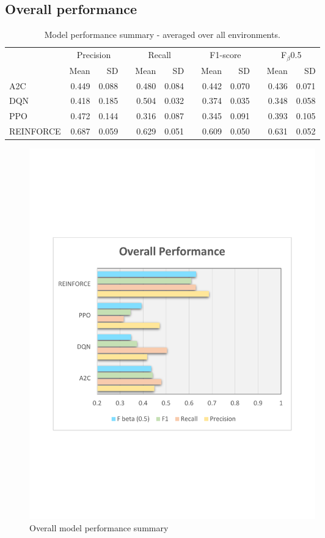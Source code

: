 \documentclass[a4paper, 12pt]{article}
\newcommand{\rowspace}[1]{\renewcommand{\arraystretch}{#1}}
\begin{document}
\subsection{Overall performance}
\begin{table}[h]\centering
	\sffamily
	\rowspace{1.3}
	\begin{tabular}{@{}l rr c rr c rr c rr@{}}
		\arrayrulecolor{black!40}\toprule
		& \multicolumn{2}{c}{Precision} & \phantom{i} & \multicolumn{2}{c}{Recall} & \phantom{i} & \multicolumn{2}{c}{F1-score} & \phantom{i} & \multicolumn{2}{c}{F$_\beta$0.5} \\
		\cmidrule{2-3} \cmidrule{5-6} \cmidrule{8-9} \cmidrule{11-12} 
		
		&Mean &SD & &Mean &SD & &Mean &SD& &Mean & SD\\ \midrule
		
		A2C & 0.449 & 0.088 & &0.480 & 0.084 & & 0.442 & 0.070 & &0.436 &0.071 \\
		DQN & 0.418 & 0.185 & &0.504 & 0.032 & & 0.374 & 0.035 & &0.348 &0.058 \\
		PPO & 0.472 & 0.144 & &0.316 & 0.087 & & 0.345 & 0.091 & &0.393 &0.105 \\
		REINFORCE & \textcolor{dblue}{0.687} & 0.059 & &\textcolor{dblue}{0.629} & 0.051 & & \textcolor{dblue}{0.609} & 0.050 & &\textcolor{dblue}{0.631} &0.052 \\
		
		\bottomrule
	\end{tabular}
	\caption{Model performance summary - averaged over all environments.}
	\label{tbl:OverallSummary}
\end{table}
\begin{figure}[h]
	\centering
	\includegraphics[width=0.6\textwidth, trim={1.5cm 7cm 1cm 7cm}]{images/OverallPlot.pdf}  
	\caption{Overall model performance summary}
	\label{fig:OverallSummary}
\end{figure}
\end{document}
